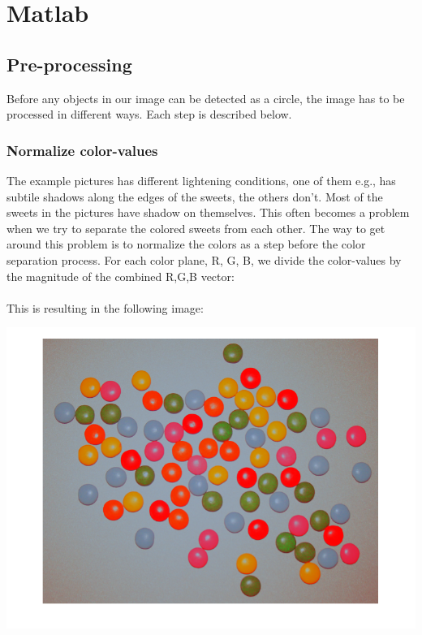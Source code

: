 \lstset{language=Matlab}
\lstset{frame=single}
\section{Matlab}
\subsection{Pre-processing}
Before any objects in our image can be detected as a circle, the image has to be processed in different ways. Each step is described below.

\subsubsection{Normalize color-values}
The example pictures has different lightening conditions, one of them e.g., has subtile shadows along the edges of the sweets, the others don't. Most of the sweets in the pictures have shadow on themselves. This often becomes a problem when we try to separate the colored sweets from each other. The way to get around this problem is to normalize the colors as a step before the color separation process. For each color plane, R, G, B, we divide the color-values by the magnitude of the combined R,G,B vector:
\\

\mbox{}\\
This is resulting in the following image:
\\
\centerline{\includegraphics[scale=0.3]{../results/sweetsA03_normalized_colors.png}}
\mbox{}\\
